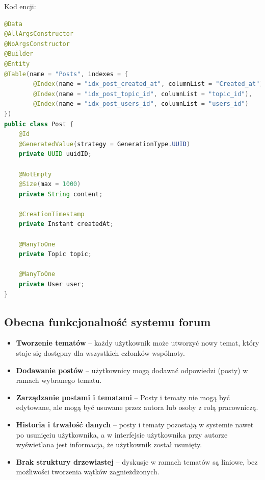 Kod encji:
\begin{lstlisting}[language=Java, caption=Encja \texttt{Post}]
@Data
@AllArgsConstructor
@NoArgsConstructor
@Builder
@Entity
@Table(name = "Posts", indexes = {
        @Index(name = "idx_post_created_at", columnList = "Created_at"),
        @Index(name = "idx_post_topic_id", columnList = "topic_id"),
        @Index(name = "idx_post_users_id", columnList = "users_id")
})
public class Post {
    @Id
    @GeneratedValue(strategy = GenerationType.UUID)
    private UUID uuidID;

    @NotEmpty
    @Size(max = 1000)
    private String content;

    @CreationTimestamp
    private Instant createdAt;

    @ManyToOne
    private Topic topic;

    @ManyToOne
    private User user;
}
\end{lstlisting}

\subsection{Obecna funkcjonalność systemu forum}
\begin{itemize}
    \item \textbf{Tworzenie tematów} -- każdy użytkownik może utworzyć nowy temat, który staje się dostępny dla wszystkich członków wspólnoty.
    \item \textbf{Dodawanie postów} -- użytkownicy mogą dodawać odpowiedzi (posty) w ramach wybranego tematu.
    \item \textbf{Zarządzanie postami i tematami} -- Posty i tematy nie mogą być edytowane, ale mogą być usuwane przez autora lub osoby z rolą pracowniczą.
    \item \textbf{Historia i trwałość danych} -- posty i tematy pozostają w systemie nawet po usunięciu użytkownika, a w interfejsie użytkownika przy autorze wyświetlana jest informacja, że użytkownik został usunięty.
    \item \textbf{Brak struktury drzewiastej} -- dyskusje w ramach tematów są liniowe, bez możliwości tworzenia wątków zagnieżdżonych.
\end{itemize}

